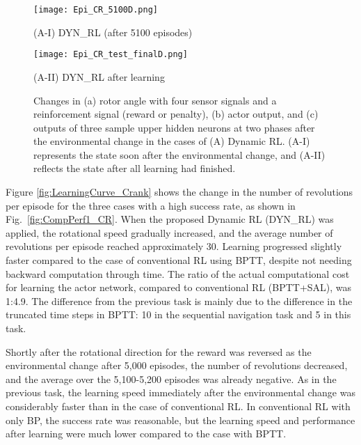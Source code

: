 \begin{figure}[pth]
\center
\centerline{\texttt{[image: Epi\_CR\_5100D.png]}}
\footnotesize{(A-I) DYN\_RL (after 5100 episodes)}
\vspace{5mm}
\centerline{\texttt{[image: Epi\_CR\_test\_finalD.png]}}
\footnotesize{(A-II) DYN\_RL after learning}
\caption{Changes in (a) rotor angle with four sensor signals and a reinforcement signal (reward or penalty),
(b) actor output, and (c) outputs of three sample upper hidden neurons
at two phases after the environmental change in the cases of (A) Dynamic RL.
(A-I) represents the state soon after the environmental change, and (A-II) reflects the state after all learning had finished.}
\label{fig:Epi_CR_after}
\end{figure}

Figure \ref{fig:LearningCurve_Crank} shows the change in the number of revolutions per episode
for the three cases with a high success rate, as shown in Fig.~\ref{fig:CompPerf1_CR}.
When the proposed Dynamic RL (DYN\_RL) was applied,
the rotational speed gradually increased, and the average number of revolutions per episode reached approximately 30.
Learning progressed slightly faster compared to the case of conventional RL using BPTT,
despite not needing backward computation through time.
The ratio of the actual computational cost for learning the actor network,
compared to conventional RL (BPTT+SAL), was 1:4.9.
The difference from the previous task is mainly
due to the difference in the truncated time steps in BPTT: 10 in the sequential navigation task and 5 in this task.

Shortly after the rotational direction for the reward was reversed as the environmental change after 5,000 episodes,
the number of revolutions decreased, and the average over the 5,100-5,200 episodes was already negative.
As in the previous task, the learning speed immediately after the environmental change was considerably faster
than in the case of conventional RL.
In conventional RL with only BP, the success rate was reasonable,
but the learning speed and performance after learning were much lower compared to the case with BPTT.

